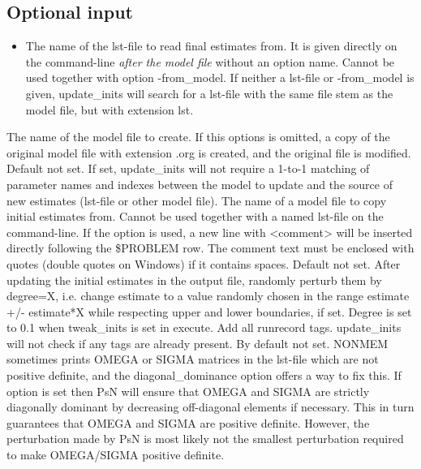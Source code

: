 \subsection{Optional input}
\begin{itemize}
\item The name of the lst-file to read final estimates from. It is given directly on 
the command-line \emph{after the model file} without an option name.
Cannot be used together with option -from\_model. 
If neither a lst-file or -from\_model is given, 
update\_inits will search for a lst-file with the same file stem as the model file, 
but with extension lst.
\end{itemize}
\begin{optionlist}
The name of the model file to create. If this options is omitted, a copy of
the original model file with extension .org is created, and 
the original file is modified.
\nextopt
{}
Default not set. If set, update\_inits will not require 
a 1-to-1 matching of parameter names and indexes between the model to update and the source
of new estimates (lst-file or other model file).
\nextopt
{}
The name of a model file to copy initial estimates from. 
Cannot be used together with a named lst-file on the command-line.
\nextopt
{}
If the option is used, a new line with <comment> will be inserted 
directly following the \$PROBLEM row.
The comment text must be enclosed with quotes (double quotes on Windows) 
if it contains spaces.
\nextopt
{}
Default not set. 
After updating the initial estimates in the output file, randomly
perturb them by degree=X, i.e. change estimate to a value
randomly chosen in the range estimate +/- estimate*X while
respecting upper and lower boundaries, if set.
Degree is set to 0.1 when tweak\_inits is set in execute.
\nextopt
{}
Add all runrecord tags. update\_inits will not check if any tags 
are already present.
\nextopt
{}
By default not set. 
NONMEM sometimes prints OMEGA or SIGMA matrices
in the lst-file which are not positive definite, and the 
diagonal\_dominance option offers a way to fix this.
If option is set then PsN will ensure that OMEGA
and SIGMA are strictly diagonally dominant by decreasing off-diagonal
elements if necessary. This in turn guarantees that OMEGA and SIGMA 
are positive definite.  However, the perturbation made by PsN is 
most likely not the smallest perturbation 
required to make OMEGA/SIGMA positive definite.

\end{optionlist}
